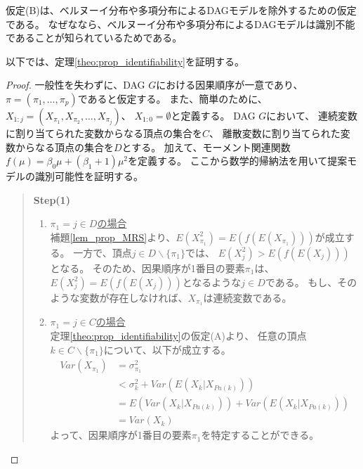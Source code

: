 仮定(B)は、ベルヌーイ分布や多項分布によるDAGモデルを除外するための仮定である。
なぜななら、ベルヌーイ分布や多項分布によるDAGモデルは識別不能であることが知られているためである\cite{Heckerman1995-es}。

以下では、定理\ref{theo:prop_identifiability}を証明する。

\begin{proof}
  一般性を失わずに、DAG $G$における因果順序が一意であり、$\pi = (\pi_1, \dots, \pi_p)$であると仮定する。
  また、簡単のために、$X_{1:j} = (X_{\pi_1}, X_{\pi_2}, \dots, X_{\pi_j})$、
  $X_{1:0} = \emptyset$と定義する。
  DAG $G$において、
  連続変数に割り当てられた変数からなる頂点の集合を$C$、
  離散変数に割り当てられた変数からなる頂点の集合を$D$とする。
  加えて、モーメント関連関数$f(\mu) = \beta_0 \mu + (\beta_1 + 1)\mu^2$を定義する。
  ここから数学的帰納法を用いて提案モデルの識別可能性を証明する。

  \begin{quote}
    \textbf{Step(1)}
    \begin{enumerate}[label=(\roman*)]
      \item
      \underline{$\pi_1 = j \in D$の場合} \\
      補題\ref{lem_prop_MRS}より、$E(X_{\pi_1}^2) = E(f(E(X_{\pi_1})))$が成立する。
      一方で、頂点$j \in D \backslash \{\pi_1\}$では、
      $E(X_j^2) > E(f(E(X_j)))$となる。
      そのため、因果順序が1番目の要素$\pi_1$は、
      $E(X_j^2) = E(f(E(X_j)))$となるような$j \in D$である。
      もし、そのような変数が存在しなければ、$X_{\pi_1}$は連続変数である。

      \item
      \underline{$\pi_1 = j \in C$の場合}\\
      定理\ref{theo:prop_identifiability}の仮定(A)より、
      任意の頂点$k \in C \backslash \{\pi_1\}$について、以下が成立する。
      \begin{align*}
        \mathit{Var}(X_{\pi_1}) &= \sigma_{\pi_1}^2 \\
                                &< \sigma_k^2 + \mathit{Var}(E(X_k | X_{Pa(k)})) \\
                                &= E(\mathit{Var}(X_k | X_{Pa(k)})) + \mathit{Var}(E(X_k | X_{Pa(k)})) \\
                                &= \mathit{Var}(X_k)
      \end{align*}
      よって、因果順序が1番目の要素$\pi_1$を特定することができる。
    \end{enumerate}
  \end{quote}


\end{proof}
